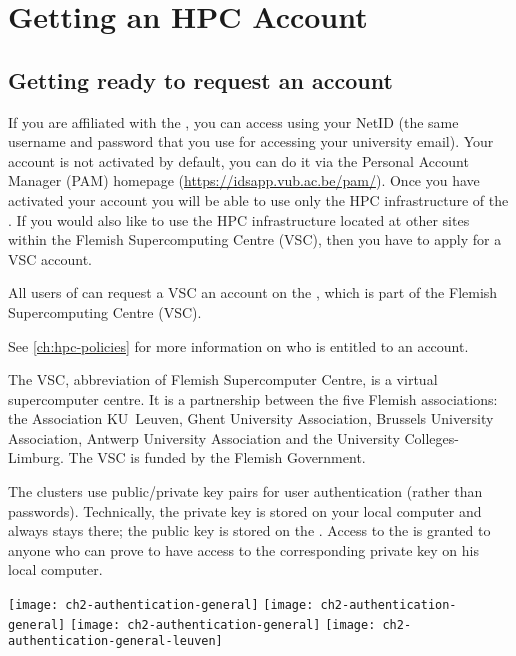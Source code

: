 \chapter{Getting an HPC Account}
\label{ch:getting-a-hpc-account}

\section{Getting ready to request an account}
\label{sec:getting-ready-to-request-an-account}

\ifbrussel
 If you are affiliated with the \university, you can access \hpc using your NetID
 (the same username and password that you use for accessing your university email).
 Your \hpc account is not activated by default, you can do it via the Personal
 Account Manager (PAM) homepage (\url{https://idsapp.vub.ac.be/pam/}).
 Once you have activated your \hpcname account you will be able to use only the HPC
 infrastructure of the \university. If you would also like to use the HPC infrastructure
 located at other sites within the Flemish Supercomputing Centre (VSC), then you have
 to apply for a VSC account.
\fi

All users of \association can request
\ifbrussel
 a VSC
 \else
 an
\fi
account on
the \hpc, which is part of the Flemish Supercomputing Centre (VSC).

See \autoref{ch:hpc-policies} for more information on who is entitled to an account.

The VSC, abbreviation of Flemish Supercomputer Centre, is a virtual
supercomputer centre. It is a partnership between the five Flemish
associations: the Association KU~Leuven,  Ghent University Association, Brussels
University Association, Antwerp University Association and the University
Colleges-Limburg. The VSC is funded by the Flemish Government.


The \hpcInfra clusters use public/private key pairs for user authentication
(rather than passwords). Technically, the private key is stored on your local
computer and always stays there; the public key is stored on the \hpc.
Access to the \hpc is granted to anyone who can prove to have access to the
corresponding private key on his local computer.

\begin{center}
\ifantwerpen
\texttt{[image: ch2-authentication-general]}
\fi
\ifbrussel
\texttt{[image: ch2-authentication-general]}
\fi
\ifgent
\texttt{[image: ch2-authentication-general]}
\fi
\ifleuven
\texttt{[image: ch2-authentication-general-leuven]}
\fi
\end{center}

